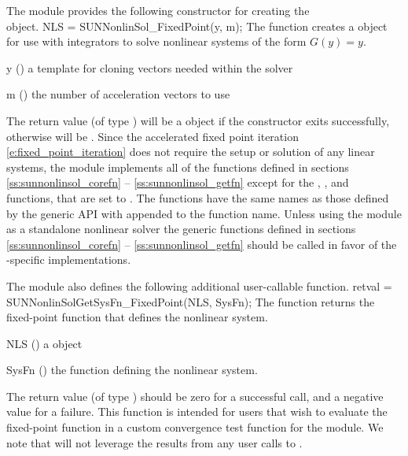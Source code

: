 The {\sunnonlinsolfixedpoint} module provides the following constructor
for creating the\\ \noindent
{} object.
{
  NLS = SUNNonlinSol\_FixedPoint(y, m);
}
{
  The function  creates a
   object for use with {\sundials} integrators to
  solve nonlinear systems of the form $G(y) = y$.
}
{
  \begin{args}[y]
  \item[y] ()
    a template for cloning vectors needed within the solver
  \item[m] ()
    the number of acceleration vectors to use
  \end{args}
}
{
  The return value  (of type ) will be
  a {\sunnonlinsol} object if the constructor exits successfully,
  otherwise  will be .
}
{}
Since the accelerated fixed point iteration
\eqref{e:fixed_point_iteration} does not require the setup or solution
of any linear systems, the {\sunnonlinsolfixedpoint} module implements
all of the functions defined in sections \ref{ss:sunnonlinsol_corefn} --
\ref{ss:sunnonlinsol_getfn} except for the ,
, and \\ \noindent
{} functions, that are set to .
The {\sunnonlinsolfixedpoint} functions have the same names as those
defined by the generic {\sunnonlinsol} API with 
appended to the function name.  Unless using the
{\sunnonlinsolfixedpoint} module as a standalone nonlinear solver the
generic functions defined in sections \ref{ss:sunnonlinsol_corefn} --
\ref{ss:sunnonlinsol_getfn} should be called in favor of the
{\sunnonlinsolfixedpoint}-specific implementations. 

The {\sunnonlinsolfixedpoint} module also defines the following additional
user-callable function.
{
  retval = SUNNonlinSolGetSysFn\_FixedPoint(NLS, SysFn);
}
{
  The function  returns the fixed-point
  function that defines the nonlinear system.
}
{
  \begin{args}[SysFn]
  \item[NLS] ()
    a {\sunnonlinsol} object
  \item[SysFn] ()
    the function defining the nonlinear system.
  \end{args}
}
{
  The return value  (of type ) should be zero for a
  successful call, and a negative value for a failure.
}
{
  This function is intended for users that wish to evaluate the
  fixed-point function in a custom convergence test function for the
  {\sunnonlinsolfixedpoint} module. We note that {\sunnonlinsolfixedpoint}
  will not leverage the results from any user calls to .
}



